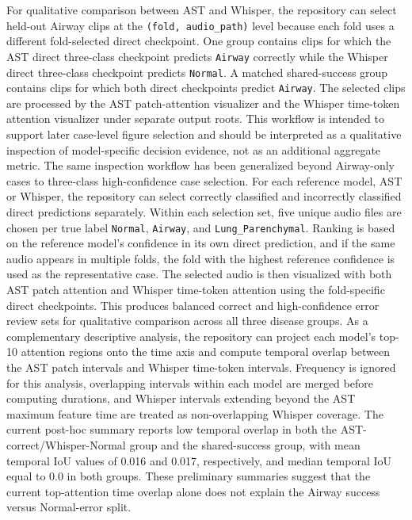 \documentclass[11pt]{article}
\begin{document}
For qualitative comparison between AST and Whisper, the repository can select
held-out Airway clips at the \texttt{(fold, audio\_path)} level because each
fold uses a different fold-selected direct checkpoint. One group contains
clips for which the AST direct three-class checkpoint predicts
\texttt{Airway} correctly while the Whisper direct three-class checkpoint
predicts \texttt{Normal}. A matched shared-success group contains clips for
which both direct checkpoints predict \texttt{Airway}. The selected clips are
processed by the AST patch-attention visualizer and the Whisper time-token
attention visualizer under separate output roots. This workflow is intended to
support later case-level figure selection and should be interpreted as a
qualitative inspection of model-specific decision evidence, not as an
additional aggregate metric.
The same inspection workflow has been generalized beyond Airway-only cases to
three-class high-confidence case selection. For each reference model, AST or
Whisper, the repository can select correctly classified and incorrectly
classified direct predictions separately. Within each selection set, five
unique audio files are chosen per true label
\texttt{Normal}, \texttt{Airway}, and \texttt{Lung\_Parenchymal}. Ranking is
based on the reference model's confidence in its own direct prediction, and if
the same audio appears in multiple folds, the fold with the highest reference
confidence is used as the representative case. The selected audio is then
visualized with both AST patch attention and Whisper time-token attention using
the fold-specific direct checkpoints. This produces balanced correct and
high-confidence error review sets for qualitative comparison across all three
disease groups.
As a complementary descriptive analysis, the repository can project each
model's top-10 attention regions onto the time axis and compute temporal
overlap between the AST patch intervals and Whisper time-token intervals.
Frequency is ignored for this analysis, overlapping intervals within each
model are merged before computing durations, and Whisper intervals extending
beyond the AST maximum feature time are treated as non-overlapping Whisper
coverage. The current post-hoc summary reports low temporal overlap in both
the AST-correct/Whisper-Normal group and the shared-success group, with mean
temporal IoU values of 0.016 and 0.017, respectively, and median temporal IoU
equal to 0.0 in both groups. These preliminary summaries suggest that the
current top-attention time overlap alone does not explain the Airway success
versus Normal-error split.
\end{document}
